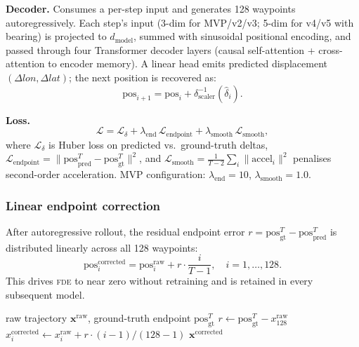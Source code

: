 \documentclass[11pt,a4paper]{article}
\newcommand{\fde}{\textsc{fde}}
\begin{document}
\textbf{Decoder.}  Consumes a per-step input and generates 128 waypoints
autoregressively.
Each step's input (3-dim for MVP/v2/v3; 5-dim for v4/v5 with bearing) is projected
to $d_\text{model}$, summed with sinusoidal positional encoding, and passed through
four Transformer decoder layers (causal self-attention + cross-attention to encoder memory).
A linear head emits predicted displacement $(\Delta lon, \Delta lat)$;
the next position is recovered as:
\[
  \text{pos}_{i+1} = \text{pos}_i + \delta_\text{scaler}^{-1}(\hat\delta_i).
\]

\textbf{Loss.}
\begin{equation}
  \mathcal{L} = \mathcal{L}_\delta + \lambda_\text{end}\,\mathcal{L}_\text{endpoint}
              + \lambda_\text{smooth}\,\mathcal{L}_\text{smooth},
  \label{eq:gen-loss}
\end{equation}
where $\mathcal{L}_\delta$ is Huber loss on predicted vs.\ ground-truth deltas,
$\mathcal{L}_\text{endpoint} = \|\text{pos}^T_\text{pred} - \text{pos}^T_\text{gt}\|^2$,
and $\mathcal{L}_\text{smooth} = \frac{1}{T-2}\sum_i\|\text{accel}_i\|^2$ penalises
second-order acceleration.
MVP configuration: $\lambda_\text{end}=10$, $\lambda_\text{smooth}=1.0$.

\subsubsection{Linear endpoint correction}
\label{sec:endpoint-correction}

After autoregressive rollout, the residual endpoint error
$r = \text{pos}^T_\text{gt} - \text{pos}^T_\text{pred}$ is distributed linearly
across all 128 waypoints:
\[
  \text{pos}_i^\text{corrected} = \text{pos}_i^\text{raw} + r \cdot \frac{i}{T-1},
  \quad i = 1,\ldots,128.
\]
This drives \fde{} to near zero without retraining and is retained in every
subsequent model.

\begin{algorithm}[ht]
\caption{Linear Endpoint Correction}
\label{alg:endpoint}
\begin{algorithmic}[1]
\REQUIRE raw trajectory $\mathbf{x}^{\text{raw}}$, ground-truth endpoint $\text{pos}^T_\text{gt}$
\STATE $r \gets \text{pos}^T_\text{gt} - x^{\text{raw}}_{128}$
    \STATE $x_i^{\text{corrected}} \gets x_i^{\text{raw}} + r \cdot (i-1)/(128-1)$
\ENDFOR
\STATE \RETURN $\mathbf{x}^{\text{corrected}}$
\end{algorithmic}
\end{algorithm}
\end{document}
